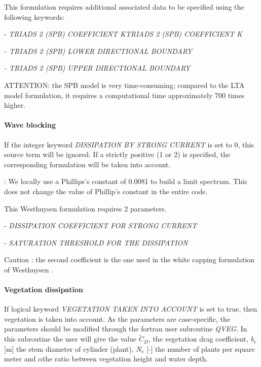  \textbf{}

 This formulation requires additional associated data to be specified using the following keywords:

 - \textit{TRIADS 2 (SPB) COEFFICIENT KTRIADS 2 (SPB) COEFFICIENT K}

 \textit{- TRIADS 2 (SPB) LOWER DIRECTIONAL BOUNDARY}

 \textit{- TRIADS 2 (SPB) UPPER DIRECTIONAL BOUNDARY}

 ATTENTION: the SPB model is very time-consuming; compared to the LTA model formulation, it requires a computational time approximately 700 times higher.


\paragraph{ Wave blocking }

 If the integer keyword \textit{DISSIPATION BY STRONG CURRENT} is set to 0, this source term will be ignored. If a strictly positive (1 or 2) is specified, the corresponding formulation will be taken into account.

 \textbf{} : We locally use a Phillips's constant of 0.0081 to build a limit spectrum. This does not change the value of Phillip's constant in the entire code.  

 \textbf{}

 This Westhuysen formulation requires 2 parameters.

 - \textit{DISSIPATION COEFFICIENT FOR STRONG CURRENT}

 - \textit{SATURATION THRESHOLD FOR THE DISSIPATION}

 Caution : the second coefficient is the one used in the white capping formulation of Westhuysen \cite{Westhuys2008}.


\paragraph{ Vegetation dissipation}

If logical keyword \textit{VEGETATION TAKEN INTO ACCOUNT} is set to true, then vegetation is taken into account. As the
parameters are case-specific, the parameters should be modified through the fortran user subroutine \textit{QVEG. }In this
subroutine the user will give the value $\tilde{C}_{D} $, the vegetation drag coefficient, \textit{b${}_{v}$} [m] the stem diameter
of cylinder (plant), \textit{N${}_{v}$} [-] the number of plants per square meter and $\alpha $the ratio between vegetation height
and water depth.

